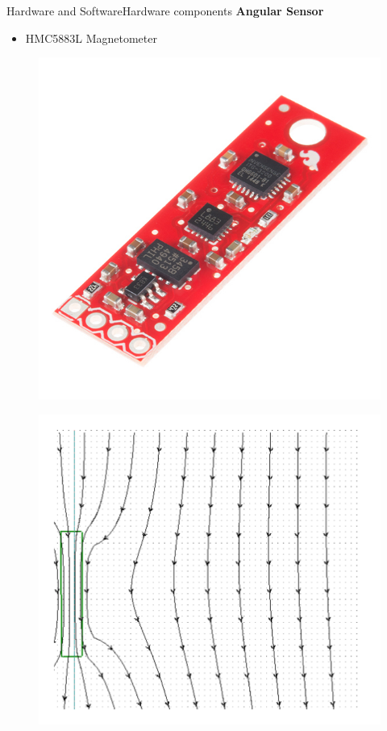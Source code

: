 \begin{frame}{Hardware and Software}{Hardware components}
\textbf{Angular Sensor}
\begin{itemize}
\item{HMC5883L Magnetometer}
\end{itemize}

  \begin{minipage}{\linewidth}
  	\begin{minipage}{0.45\linewidth}
  		\begin{figure}[H]
  			\includegraphics[scale=0.7]{Pictures/NineDegree.jpg}
  			\centering
  		\end{figure}
  	\end{minipage}
  	\hspace{0.03\linewidth}
  	\begin{minipage}{0.45\linewidth}
  		\begin{figure}[H]
  			\includegraphics[scale=0.35]{Pictures/Magne.pdf}

\end{figure}
\end{minipage}
\end{minipage}
\end{frame}
